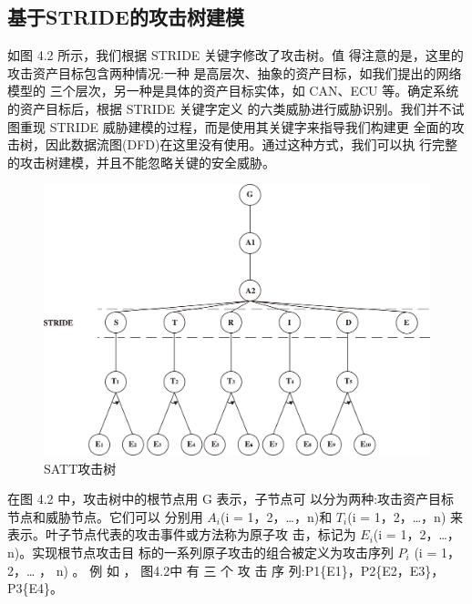 \subsection{基于STRIDE的攻击树建模}
如图 4.2 所示，我们根据 STRIDE 关键字修改了攻击树。值
得注意的是，这里的攻击资产目标包含两种情况:一种
是高层次、抽象的资产目标，如我们提出的网络模型的
三个层次，另一种是具体的资产目标实体，如 CAN、ECU
等。确定系统的资产目标后，根据 STRIDE 关键字定义
的六类威胁进行威胁识别。我们并不试图重现 STRIDE
威胁建模的过程，而是使用其关键字来指导我们构建更
全面的攻击树，因此数据流图(DFD)在这里没有使用。通过这种方式，我们可以执
行完整的攻击树建模，并且不能忽略关键的安全威胁。
\begin{figure}
    \centering
    \includegraphics[scale=0.5]{resources/img/a14.jpg}
    \caption{SATT攻击树}
  \end{figure}
\newline
在图 4.2 中，攻击树中的根节点用 G 表示，子节点可
以分为两种:攻击资产目标节点和威胁节点。它们可以
分别用 $A_i$(i = 1，2，…，n)和 $T_i$(i = 1，2，…，n)
来表示。叶子节点代表的攻击事件或方法称为原子攻
击，标记为 $E_i$(i = 1，2，…，n)。实现根节点攻击目
标的一系列原子攻击的组合被定义为攻击序列 $P_i$ (i =
1，2，… ， n) 。 例 如 ， 图4.2中 有 三 个 攻 击 序
列:P1\{E1\}，P2\{E2，E3\}，P3\{E4\}。
